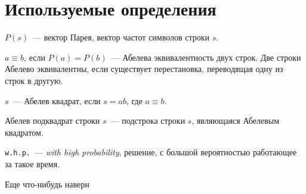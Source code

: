 \section{Используемые определения}

\begin{definition}
$P(s)$~--- вектор Парея, вектор частот символов строки $s$.
\end{definition}

\begin{definition}
$a \equiv b$, если $P(a) = P(b)$~--- Абелева эквивалентность двух строк. Две строки Абелево эквивалентны, если существует перестановка, переводящая одну из строк в другую.
\end{definition}

\begin{definition}
$s$~--- Абелев квадрат, если $s=ab$, где $a \equiv b$.
\end{definition}

\begin{definition}
Абелев подквадрат строки $s$~--- подстрока строки $s$, являющаяся Абелевым квадратом.
\end{definition}

\begin{definition}
\texttt{w.h.p.}~--- \textit{with high probability}, решение, с большой вероятностью работающее за такое время.
\end{definition}





Еще что-нибудь наверн